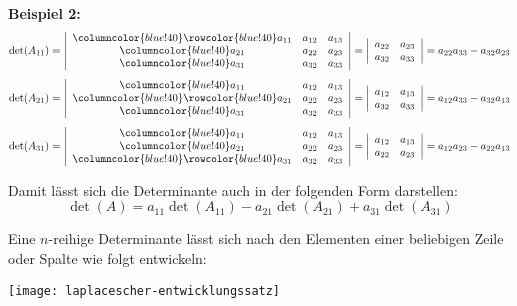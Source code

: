 \textbf{Beispiel 2:}
{\fontsize{7.5}{0}
    \[\det(A_{11}) = \left|
    \begin{array}{>{\columncolor{blue!40}}ccc}
        \rowcolor{blue!40}
        a_{11} & a_{12} & a_{13} \\
        a_{21} & a_{22} & a_{23} \\
        a_{31} & a_{32} & a_{33}
    \end{array}
    \right| = \left|
    \begin{array}{cc}
        a_{22} & a_{23} \\
        a_{32} & a_{33}
    \end{array}
    \right| = a_{22} a_{33} - a_{32} a_{23}\]
    \[\det(A_{21}) = \left|
    \begin{array}{>{\columncolor{blue!40}}ccc}
        a_{11} & a_{12} & a_{13} \\
        \rowcolor{blue!40}
        a_{21} & a_{22} & a_{23} \\
        a_{31} & a_{32} & a_{33}
    \end{array}
    \right| = \left|
    \begin{array}{cc}
        a_{12} & a_{13} \\
        a_{32} & a_{33}
    \end{array}
    \right| = a_{12} a_{33} - a_{32} a_{13}\]
    \[\det(A_{31}) = \left|
    \begin{array}{>{\columncolor{blue!40}}ccc}
        a_{11} & a_{12} & a_{13} \\
        a_{21} & a_{22} & a_{23} \\
        \rowcolor{blue!40}
        a_{31} & a_{32} & a_{33}
    \end{array}
    \right| = \left|
    \begin{array}{cc}
        a_{12} & a_{13} \\
        a_{22} & a_{23}
    \end{array}
    \right| = a_{12} a_{23} - a_{22} a_{13}\]
}

Damit lässt sich die Determinante auch in der folgenden Form darstellen: \[\det(A) = a_{11} \det(A_{11}) - a_{21} \det(A_{21}) + a_{31} \det(A_{31})\]


Eine $n$-reihige Determinante lässt sich nach den Elementen einer beliebigen Zeile oder Spalte wie folgt entwickeln:

\texttt{[image: laplacescher-entwicklungssatz]}


